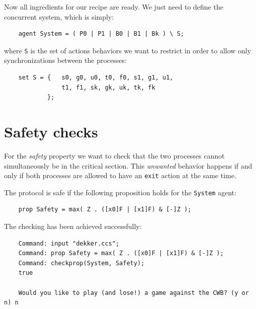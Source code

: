 \documentclass[10pt,a4paper]{article}
\newcommand{\CCSCode}[1]{{\tt #1}}
\begin{document}
        Now all ingredients for our recipe are ready. We just need to
        define the concurrent system, which is simply:
        \begin{verbatim}
    agent System = ( P0 | P1 | B0 | B1 | Bk ) \ S;
        \end{verbatim}
        where \CCSCode{S} is the set of actions behaviors we want to
        restrict in order to allow only synchronizations between the
        processes:
        \begin{verbatim}
    set S = {   s0, g0, u0, t0, f0, s1, g1, u1,
                t1, f1, sk, gk, uk, tk, fk
            };
        \end{verbatim}

\section{Safety checks}

    For the \emph{safety} property we want to check that the two
    processes cannot simultaneously be in the critical section.
    This \emph{unwanted} behavior happens if and only if both
    processes are allowed to have an \CCSCode{exit} action at the same
    time.

    The protocol is safe if the following proposition holds for the
    \CCSCode{System} agent:
    \begin{verbatim}
    prop Safety = max( Z . ([x0]F | [x1]F) & [-]Z );
    \end{verbatim}

    The checking has been achieved successfully:
    \begin{verbatim}
    Command: input "dekker.ccs";
    Command: prop Safety = max( Z . ([x0]F | [x1]F) & [-]Z );
    Command: checkprop(System, Safety);
    true

    Would you like to play (and lose!) a game against the CWB? (y or n) n
    \end{verbatim}
\end{document}
